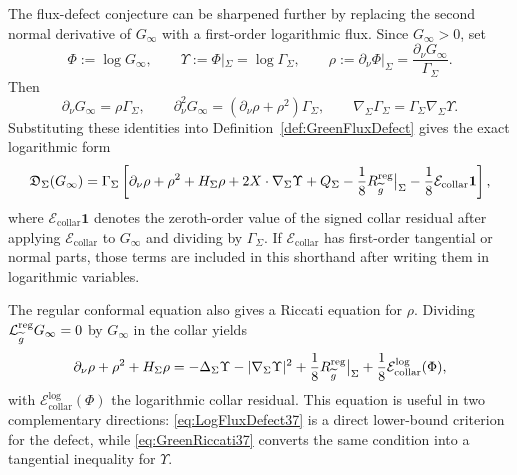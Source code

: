 The flux-defect conjecture can be sharpened further by replacing the second normal derivative of \(G_\infty\) with a first-order logarithmic flux. Since \(G_\infty>0\), set
\[
    \Phi:=\log G_\infty,\qquad
    \Upsilon:=\Phi|_\Sigma=\log\Gamma_\Sigma,\qquad
    \rho:=\partial_\nu\Phi|_\Sigma
    =\frac{\partial_\nu G_\infty}{\Gamma_\Sigma}.
\]
Then
\[
    \partial_\nu G_\infty=\rho\Gamma_\Sigma,\qquad
    \partial_\nu^2G_\infty=(\partial_\nu\rho+\rho^2)\Gamma_\Sigma,
    \qquad
    \nabla_\Sigma\Gamma_\Sigma=\Gamma_\Sigma\nabla_\Sigma\Upsilon .
\]
Substituting these identities into Definition~\ref{def:GreenFluxDefect} gives the exact logarithmic form
\begin{equation}\label{eq:LogFluxDefect37}
    \mathfrak D_\Sigma(G_\infty)
    =
    \Gamma_\Sigma
    \left[
        \partial_\nu\rho+\rho^2+H_\Sigma\rho
        +2X\cdot\nabla_\Sigma\Upsilon
        +Q_\Sigma-\frac18 R_{\widetilde{g}}^{\mathrm{reg}}\big|_\Sigma
        -\frac18\mathcal E_{\mathrm{collar}}\mathbf 1
    \right],
\end{equation}
where \(\mathcal E_{\mathrm{collar}}\mathbf 1\) denotes the zeroth-order value of the signed collar residual after applying \(\mathcal E_{\mathrm{collar}}\) to \(G_\infty\) and dividing by \(\Gamma_\Sigma\). If \(\mathcal E_{\mathrm{collar}}\) has first-order tangential or normal parts, those terms are included in this shorthand after writing them in logarithmic variables.

The regular conformal equation also gives a Riccati equation for \(\rho\). Dividing
\(\mathcal L_{\widetilde{g}}^{\mathrm{reg}}G_\infty=0\) by \(G_\infty\) in the collar yields
\begin{equation}\label{eq:GreenRiccati37}
    \partial_\nu\rho+\rho^2+H_\Sigma\rho
    =
    -\Delta_\Sigma\Upsilon
    -|\nabla_\Sigma\Upsilon|^2
    +\frac18R_{\widetilde{g}}^{\mathrm{reg}}\big|_\Sigma
    +\frac18\mathcal E_{\mathrm{collar}}^{\log}(\Phi),
\end{equation}
with \(\mathcal E_{\mathrm{collar}}^{\log}(\Phi)\) the logarithmic collar residual. This equation is useful in two complementary directions: \eqref{eq:LogFluxDefect37} is a direct lower-bound criterion for the defect, while \eqref{eq:GreenRiccati37} converts the same condition into a tangential inequality for \(\Upsilon\).

